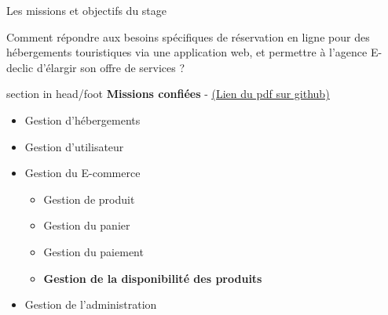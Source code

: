 \documentclass{beamer}
\begin{document}
\begin{frame}{Les missions et objectifs du stage}

	Comment répondre aux besoins spécifiques de réservation en ligne pour des hébergements touristiques via une application web, et permettre à l’agence E-declic d’élargir son offre de services ?
			
	\begin{center}
  		\begin{minipage}{0.9\textwidth}
			\begin{beamercolorbox}[wd=\paperwidth,ht=1.5em,dp=0.5em,leftskip=0.5cm]{section in head/foot}
  				\large \textbf{Missions confiées} - \href{https://github.com/Matteo-K/Soutenance_E-delic/blob/main/pdf/cc-painspizzas-camping.pdf}{\underline{(Lien du pdf sur github)}}
			\end{beamercolorbox}
			\begin{itemize}
				\item Gestion d'hébergements
				\item Gestion d'utilisateur
				\item Gestion du E-commerce
				\begin{itemize}
					\item Gestion de produit
					\item Gestion du panier
					\item Gestion du paiement
					\item \textbf{Gestion de la disponibilité des produits}
				\end{itemize}
				\item Gestion de l'administration
			\end{itemize}
  		\end{minipage}
  		\vspace{1cm}
	\end{center}
	\vfill
\end{frame}
\end{document}
